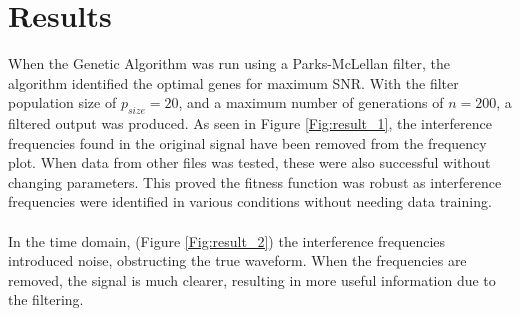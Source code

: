 \documentclass[a4paper, 11pt]{article}
\begin{document}
\section{Results}\label{sec:res}
    When the Genetic Algorithm was run using a Parks-McLellan filter, the algorithm identified the optimal genes for maximum SNR. 
    With the filter population size of $p_{size} = 20$, and a maximum number of generations of $n = 200$, a filtered 
    output was produced. As seen in Figure \ref{Fig:result_1}, the interference frequencies found in the original signal have 
    been removed from the frequency plot. When data from other files was tested, these were also successful without changing 
    parameters. This proved the fitness function was robust as interference frequencies were identified in various conditions
    without needing data training. 
    \\\\
    In the time domain, (Figure \ref{Fig:result_2}) the interference frequencies introduced noise, obstructing the true waveform. 
    When the frequencies are removed, the signal is much clearer, resulting in more useful information due to the filtering. 
    
\end{document}
